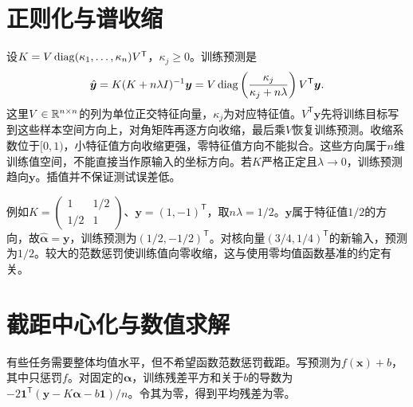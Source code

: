 \section{正则化与谱收缩}
设$K=V\operatorname{diag}(\kappa_1,\ldots,\kappa_n)V^{\mathsf T}$，$\kappa_j\ge0$。训练预测是
\begin{equation}
 \hat{\bm y}=K(K+n\lambda I)^{-1}\bm y
 =V\operatorname{diag}\left(\frac{\kappa_j}{\kappa_j+n\lambda}\right)V^{\mathsf T}\bm y.
 \label{eq:krr-spectral-shrinkage}
\end{equation}
这里$V\in\mathbb{R}^{n\times n}$的列为单位正交特征向量，$\kappa_j$为对应特征值。$V^{\mathsf T}\bm y$先将训练目标写到这些样本空间方向上，对角矩阵再逐方向收缩，最后乘$V$恢复训练预测。收缩系数位于$[0,1)$，小特征值方向收缩更强，零特征值方向不能拟合。这些方向属于$n$维训练值空间，不能直接当作原输入的坐标方向。若$K$严格正定且$\lambda\to0$，训练预测趋向$\bm y$。插值并不保证测试误差低。

例如$K=\left(\begin{smallmatrix}1&1/2\\1/2&1\end{smallmatrix}\right)$、$\bm y=(1,-1)^{\mathsf T}$，取$n\lambda=1/2$。$\bm y$属于特征值$1/2$的方向，故$\hat{\bm\alpha}=\bm y$，训练预测为$(1/2,-1/2)^{\mathsf T}$。对核向量$(3/4,1/4)^{\mathsf T}$的新输入，预测为$1/2$。较大的范数惩罚使训练值向零收缩，这与使用零均值函数基准的约定有关。

\section{截距中心化与数值求解}
有些任务需要整体均值水平，但不希望函数范数惩罚截距。写预测为$f(\bm x)+b$，其中只惩罚$f$。对固定的$\bm\alpha$，训练残差平方和关于$b$的导数为$-2\bm1^{\mathsf T}(\bm y-K\bm\alpha-b\bm1)/n$。令其为零，得到平均残差为零。


